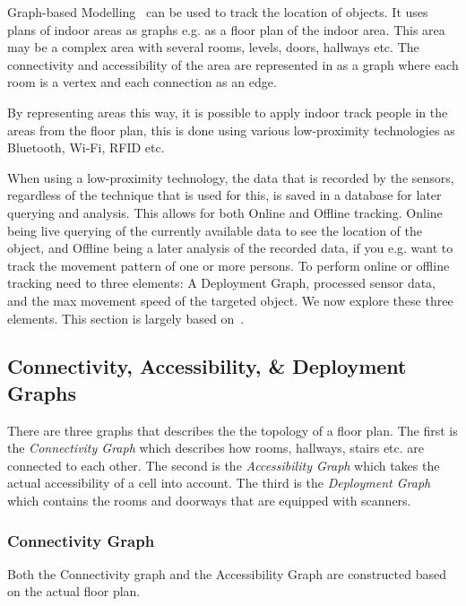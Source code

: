 Graph-based Modelling~\cite{Jensen:2009:GMB:1590953.1591000} can be used to track the location of objects. 
It uses plans of indoor areas as graphs e.g. as a floor plan of the indoor area. 
This area may be a complex area with several rooms, levels, doors, hallways etc. 
The connectivity and accessibility of the area are represented in as a graph where each room is a vertex and each connection as an edge. 

By representing areas this way, it is possible to apply indoor track people in the areas from the floor plan, this is done using various low-proximity technologies as Bluetooth, Wi-Fi, RFID etc.

When using a low-proximity technology, the data that is recorded by the sensors, regardless of the technique that is used for this, is saved in a database for later querying and analysis. 
This allows for both Online and Offline tracking.
Online being live querying of the currently available data to see the location of the object, and Offline being a later analysis of the recorded data, if you e.g. want to track the movement pattern of one or more persons. 
To perform online or offline tracking need to three elements: A Deployment Graph, processed sensor data, and the max movement speed of the targeted object.
We now explore these three elements.
This section is largely based on~\cite{Jensen:2009:GMB:1590953.1591000}.


\subsection{Connectivity, Accessibility, \& Deployment Graphs}
There are three graphs that describes the the topology of a floor plan. 
The first is the \textit{Connectivity Graph} which describes how rooms, hallways, stairs etc. are connected to each other. 
The second is the \textit{Accessibility Graph} which takes the actual accessibility of a cell into account. 
The third is the \textit{Deployment Graph} which contains the rooms and doorways that are equipped with scanners.


\subsubsection{ \quad Connectivity Graph}
Both the Connectivity graph and the Accessibility Graph are constructed based on the actual floor plan. 

